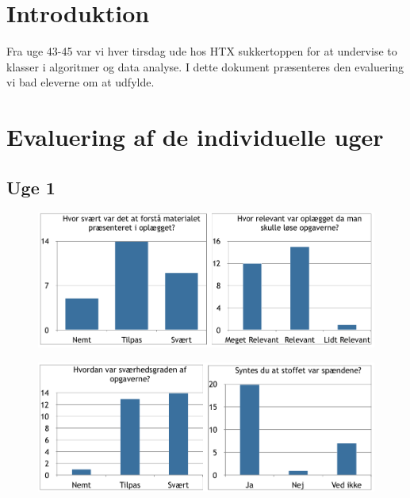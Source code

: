 \documentclass{article}
\begin{document}
    \newpage                %
    \setcounter{page}{1}    %
\section{Introduktion}
    Fra uge 43-45 var vi hver tirsdag ude hos HTX sukkertoppen for at undervise
    to klasser i algoritmer og data analyse.
    I dette dokument præsenteres den evaluering vi bad eleverne om at udfylde.

\section{Evaluering af de individuelle uger}
    \subsection{Uge 1}
    \begin{figure}[h!]
        \centering
        \includegraphics[width=1\textwidth]{include/uge1-1.png}
    \end{figure}

    \begin{figure}[h!]
        \centering
        \includegraphics[width=1\textwidth]{include/uge1-2.png}
    \end{figure}
\end{document}

